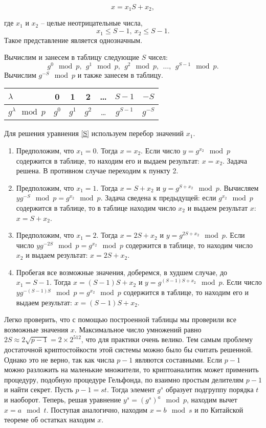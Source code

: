 \begin{equation}
    x=x_{1} S+x_{2},
    \label{S}
\end{equation}

где $x_{1}$ и $x_{2}$ -- целые неотрицательные числа,
    \[ x_{1} \le S-1, ~ x_{2} \le S-1. \]
Такое представление является однозначным.

Вычислим и занесем в таблицу следующие $S$  чисел:
    \[ g^{0} \mod p, ~~ g^{1} \mod p, ~~ g^{2} \mod p, ~~ \dots, ~~ g^{S-1} \mod p. \]
Вычислим $g^{-S} \mod p$ и также занесем в таблицу.

\begin{center} \begin{tabular}{|l|c|c|c|c|c|c|}
    \hline
    $\lambda $ & 0 & 1 & 2 & \dots & $S-1$ & $-S$ \\
    \hline
    $g^{\lambda} \mod p$ & $g^{0}$ & $g^{1}$ & $g^{2}$ & \dots & $g^{S-1}$ & $g^{-S}$ \\
    \hline
\end{tabular} \end{center}

Для решения уравнения \ref{S} используем перебор значений $x_{1}$.
\begin{enumerate}
    \item Предположим, что $x_{1} = 0$. Тогда $x = x_{2}$. Если число $y = g^{x_{2}} \mod p$ содержится в таблице, то находим его и выдаем результат: $x=x_{2} $. Задача решена. В противном случае переходим к пункту 2.
    \item Предположим, что $x_{1} =1$. Тогда $x=S+x_{2} $ и $y=g^{S+x_{2}} \mod p$. Вычисляем $yg^{-S} \mod p=g^{x_{2}} \mod p$. Задача сведена к предыдущей: если $g^{x_{2} } \mod p$ содержится в таблице, то в таблице находим число $x_{2} $ и выдаем результат $x$: $x=S+x_{2} $.
    \item Предположим, что $x_{1} =2$. Тогда $x=2S+x_{2} $ и $y=g^{2S+x_{2} } \mod p$. Если число $yg^{-2S} \mod p=g^{x_{2} } \mod p$ содержится в таблице, то находим число $x_{2}$ и выдаем результат: $x = 2S + x_{2}$.
     \item Пробегая все возможные значения, доберемся, в худшем случае, до $x_{1} =S-1$. Тогда $x=(S-1)S+x_{2} $ и $y = g^{(S-1)S+x_{2} } \mod p$. Если число $yg^{-(S-1)S} \mod p=g^{x_{2}} \mod p$ содержится в таблице, то находим его и выдаем результат: $x=(S-1)S+x_{2}$.
\end{enumerate}

Легко проверить, что с помощью построенной таблицы мы проверили все возможные значения $x$. Максимальное число умножений равно $2S \approx 2\sqrt{p-1} =2\times 2^{512} $, что для практики очень велико. Тем самым проблему достаточной криптостойкости этой системы можно было бы считать решенной. Однако это не верно, так как числа $p-1$ являются составными. Если  $p-1$ можно разложить на маленькие множители, то криптоаналитик может применить процедуру, подобную процедуре Гельфонда, по взаимно простым делителям  $p-1$  и найти секрет. Пусть  $p-1=st$. Тогда элемент $g^s$ образует подгруппу порядка $t$ и наоборот. Теперь, решая уравнение $y^s=(g^s)^a\mod p$, находим вычет $x=a\mod t$. Поступая аналогично, находим $x=b\mod s$ и по Китайской теореме об остатках находим $x$.

